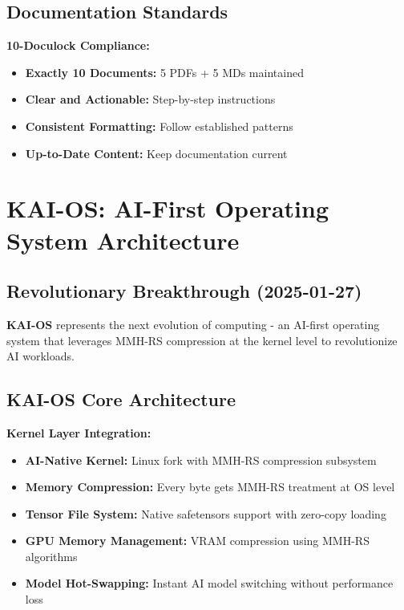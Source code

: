 \documentclass[12pt,a4paper]{article}
\begin{document}
\subsection{Documentation Standards}

\textbf{10-Doculock Compliance:}
\begin{itemize}
    \item \textbf{Exactly 10 Documents:} 5 PDFs + 5 MDs maintained
    \item \textbf{Clear and Actionable:} Step-by-step instructions
    \item \textbf{Consistent Formatting:} Follow established patterns
    \item \textbf{Up-to-Date Content:} Keep documentation current
\end{itemize}

\section{KAI-OS: AI-First Operating System Architecture}

\subsection{Revolutionary Breakthrough (2025-01-27)}

\textbf{KAI-OS} represents the next evolution of computing - an AI-first operating system that leverages MMH-RS compression at the kernel level to revolutionize AI workloads.

\subsection{KAI-OS Core Architecture}

\textbf{Kernel Layer Integration:}
\begin{itemize}
    \item \textbf{AI-Native Kernel:} Linux fork with MMH-RS compression subsystem
    \item \textbf{Memory Compression:} Every byte gets MMH-RS treatment at OS level
    \item \textbf{Tensor File System:} Native safetensors support with zero-copy loading
    \item \textbf{GPU Memory Management:} VRAM compression using MMH-RS algorithms
    \item \textbf{Model Hot-Swapping:} Instant AI model switching without performance loss
\end{itemize}
\end{document}
